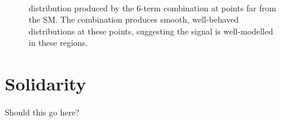     \begin{figure}
        \\
        \caption{
            \mhh distribution produced by the 6-term combination at points far from the SM.
            The combination produces smooth, well-behaved distributions at these points,
                suggesting the signal is well-modelled in these regions.
        }
        \label{fig:vbf_hh_6term_preview}
    \end{figure}



\section{Solidarity}
    
    Should this go here?
